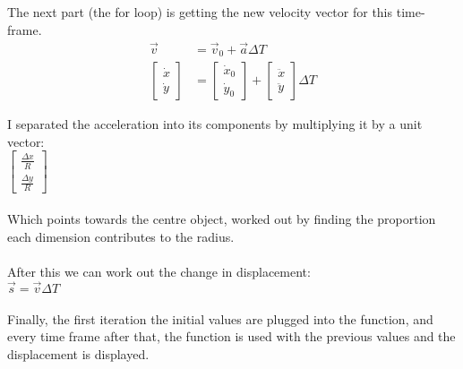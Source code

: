 \documentclass{article}
\begin{document}
\\\\The next part (the for loop) is getting the new velocity vector for this time-frame.
\\
\begin{align*}
\vec{v}&=\vec{v}_0 + \vec{a} \Delta T\\
\begin{bmatrix}\dot{x} \\ \dot{y}\end{bmatrix} &= \begin{bmatrix}\dot{x}_{0} \\\dot{y}_0\end{bmatrix}+\begin{bmatrix}\ddot{x} \\ \ddot{y}\end{bmatrix}\Delta T
\end{align*}

I separated the acceleration into its components by multiplying it by a unit vector:
\\$\begin{bmatrix}\frac{\Delta x}{R} \\\frac{\Delta y}{R} \end{bmatrix}$
\\\\Which points towards the centre object, worked out by finding the proportion each dimension contributes to the radius.
\\\\After this we can work out the change in displacement:
\\$\vec{s}=\vec{v}\Delta T$
\\\\Finally, the first iteration the initial values are plugged into the function, and every time frame after that, the function is used with the previous values and the displacement is displayed.
\end{document}
